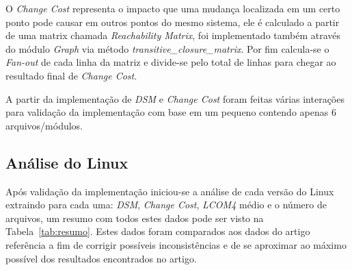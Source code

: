 \documentclass[conference]{IEEEtran}
\begin{document}
O {\it Change Cost} representa o impacto que uma mudança localizada em um
certo ponto pode causar em outros pontos do mesmo sistema, ele é calculado a
partir de uma matrix chamada {\it Reachability
Matrix}\cite{ReachabilityMatrices}, foi implementado também através do módulo
{\it Graph} via método {\it transitive\_closure\_matrix}. Por fim calcula-se o
{\it Fan-out} de cada linha da matriz e divide-se pelo total de linhas para
chegar ao resultado final de {\it Change Cost}.

A partir da implementação de {\it DSM} e {\it Change Cost} foram feitas várias
interações para validação da implementação com base em um pequeno contendo
apenas 6 arquivos/módulos.

\subsection{Análise do Linux}

Após validação da implementação iniciou-se a análise de cada versão do Linux
extraindo para cada uma: {\it DSM}, {\it Change Cost},
{\it LCOM4} médio e o número de arquivos, um resumo com todos estes dados
pode ser visto na Tabela~\ref{tab:resumo}. Estes dados foram comparados aos
dados do artigo referência\cite{ExploringStructure} a fim de corrigir
possíveis inconsistências e de se aproximar ao máximo possível dos resultados
encontrados no artigo.
\end{document}
